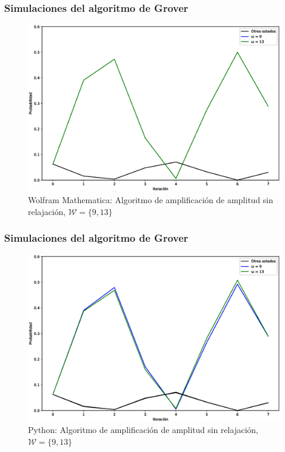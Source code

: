 \documentclass[xetex,mathserif,serif, 8pt]{beamer}
\begin{document}
\begin{frame}
    \frametitle{Simulaciones del algoritmo de Grover}
    \begin{figure}[H]
        \centering
        \includegraphics[width=0.9\linewidth]{img/grover2M.eps}
        \caption{Wolfram Mathematica: Algoritmo de amplificación de amplitud sin relajación, $\mathcal{W} = \{9, 13\}$}
    \end{figure}
\end{frame}

\begin{frame}
    \frametitle{Simulaciones del algoritmo de Grover}
    \vspace{-0.5cm}
    \begin{figure}[H]
        \centering
        \includegraphics[width=0.9\linewidth]{img/grover2lossless.eps}
        \caption{Python: Algoritmo de amplificación de amplitud sin relajación, $\mathcal{W} = \{9, 13\}$}
    \end{figure}

\end{frame}
\end{document}
